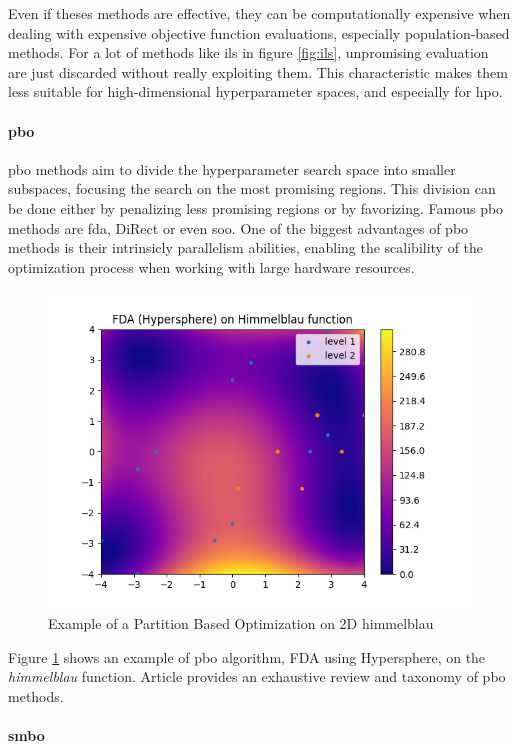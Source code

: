 Even if theses methods are effective, they can be computationally expensive when dealing with expensive objective function evaluations, especially population-based methods. For a lot of methods like \acrshort{ils} in figure \ref{fig:ils}, unpromising evaluation are just discarded without really exploiting them. This characteristic makes them less suitable for high-dimensional hyperparameter spaces, and especially for \acrshort{hpo}.

\paragraph{\acrfull{pbo}}  

\acrfull{pbo} methods aim to divide the hyperparameter search space into smaller subspaces, focusing the search on the most promising regions. This division can be done either by penalizing less promising regions or by favorizing. Famous \acrshort{pbo} methods are \acrfull{fda}\cite{nakib_deterministic_2017}, DiRect \cite{jones_lipschitzian_1993} or even \acrfull{soo}\cite{munos_optimistic_2011}. One of the biggest advantages of \acrshort{pbo} methods is their intrinsicly parallelism abilities, enabling the scalibility of the optimization process when working with large hardware resources.

\begin{figure}[h]
    \centering
    \includegraphics[width=0.5\linewidth]{assets/img/chap_2/plots/fda.png}
    \caption{Example of a Partition Based Optimization on 2D himmelblau}
    \label{fig:pbo}
\end{figure}

Figure \ref{fig:pbo} shows an example of \acrshort{pbo} algorithm, FDA using Hypersphere, on the \textit{himmelblau} function. Article \cite{firmin_comparative_2023} provides an exhaustive review and taxonomy of \acrshort{pbo} methods.


\paragraph{\acrfull{smbo}} 

